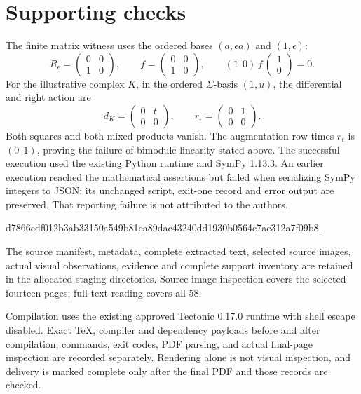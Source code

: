 \documentclass[10pt]{article}
\begin{document}
\section*{Supporting checks}
The finite matrix witness uses the ordered bases \((a,\epsilon a)\) and \((1,\epsilon)\): \[R_\epsilon=\begin{pmatrix}0&0\\1&0\end{pmatrix},
 \qquad f=\begin{pmatrix}0&0\\1&0\end{pmatrix},
 \qquad (1\ \ 0)\,f\,\begin{pmatrix}1\\0\end{pmatrix}=0.\] For the illustrative complex \(K\), in the ordered \(\Sigma\)-basis \((1,u)\), the differential and right action are \[d_K=\begin{pmatrix}0&t\\0&0\end{pmatrix},
 \qquad r_\epsilon=\begin{pmatrix}0&1\\0&0\end{pmatrix}.\] Both squares and both mixed products vanish. The augmentation row times \(r_\epsilon\) is \((0\ \ 1)\), proving the failure of bimodule linearity stated above. The successful execution used the existing Python runtime and SymPy 1.13.3. An earlier execution reached the mathematical assertions but failed when serializing SymPy integers to JSON; its unchanged script, exit-one record and error output are preserved. That reporting failure is not attributed to the authors.\par
d7866edf012b3ab33150a549b81ca89dac43240dd1930b0564c7ac312a7f09b8.\par
The source manifest, metadata, complete extracted text, selected source images, actual visual observations, evidence and complete support inventory are retained in the allocated staging directories. Source image inspection covers the selected fourteen pages; full text reading covers all 58.\par
Compilation uses the existing approved Tectonic 0.17.0 runtime with shell escape disabled. Exact TeX, compiler and dependency payloads before and after compilation, commands, exit codes, PDF parsing, and actual final-page inspection are recorded separately. Rendering alone is not visual inspection, and delivery is marked complete only after the final PDF and those records are checked.\par
\end{document}
